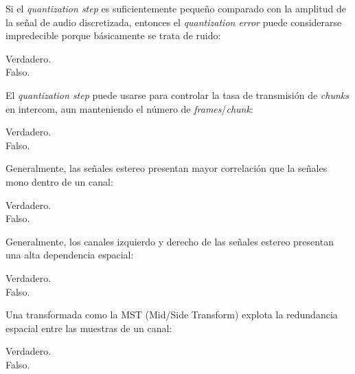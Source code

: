 \documentclass[legalpaper, 12pt, addpoints]{exam}
\begin{document}
\begin{questions}
\vspace{0.10in}

\question Si el \emph{quantization step} es suficientemente pequeño
comparado con la amplitud de la señal de audio discretizada, entonces
el \emph{quantization error} puede considerarse impredecible porque
básicamente se trata de ruido:

\begin{oneparchoices}
  \choice Verdadero.\\
  \choice Falso.
\end{oneparchoices}
  
\vspace{0.10in}

\question El \emph{quantization step} puede usarse para controlar la
tasa de transmisión de \emph{chunks} en intercom, aun manteniendo el número de
\emph{frames}/\emph{chunk}:

\begin{oneparchoices}
  \choice Verdadero.\\
  \choice Falso.
\end{oneparchoices}
  
\vspace{0.10in}

\question Generalmente, las señales estereo presentan mayor
correlación que la señales mono dentro de un canal:

\begin{oneparchoices}
  \choice Verdadero.\\
  \choice Falso.
\end{oneparchoices}
  
\vspace{0.10in}

\question Generalmente, los canales izquierdo y derecho de las señales
estereo presentan una alta dependencia espacial:

\begin{oneparchoices}
  \choice Verdadero.\\
  \choice Falso.
\end{oneparchoices}
  
\vspace{0.10in}

\question Una transformada como la MST (Mid/Side Transform) explota la
redundancia espacial entre las muestras de un canal:

\begin{oneparchoices}
  \choice Verdadero.\\
  \choice Falso.
\end{oneparchoices}
  

\end{questions}
\end{document}
